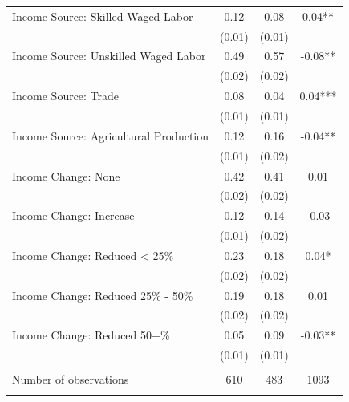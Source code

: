 \begin{tabular}{@{\extracolsep{5pt}}lccc}
Income Source: Skilled Waged Labor   & 0.12    & 0.08    & 0.04**   \\
 & (0.01)  & (0.01)  &  \\ [1ex]
Income Source: Unskilled Waged Labor   & 0.49    & 0.57    & -0.08**   \\
 & (0.02)  & (0.02)  &  \\ [1ex]
Income Source: Trade   & 0.08    & 0.04    & 0.04***   \\
 & (0.01)  & (0.01)  &  \\ [1ex]
Income Source: Agricultural Production   & 0.12    & 0.16    & -0.04**   \\
 & (0.01)  & (0.02)  &  \\ [1ex]
Income Change: None   & 0.42    & 0.41    & 0.01   \\
 & (0.02)  & (0.02)  &  \\ [1ex]
Income Change: Increase   & 0.12    & 0.14    & -0.03   \\
 & (0.01)  & (0.02)  &  \\ [1ex]
Income Change: Reduced < 25\%   & 0.23    & 0.18    & 0.04*   \\
 & (0.02)  & (0.02)  &  \\ [1ex]
Income Change: Reduced 25\% - 50\%   & 0.19    & 0.18    & 0.01   \\
 & (0.02)  & (0.02)  &  \\ [1ex]
Income Change: Reduced 50+\%   & 0.05    & 0.09    & -0.03**   \\
 & (0.01)  & (0.01)  &  \\ [1ex]
\hline \\[-1.8ex]
Number of observations  & 610   & 483  & 1093  \\
\hline \hline \\[-1.8ex]

\end{tabular}
